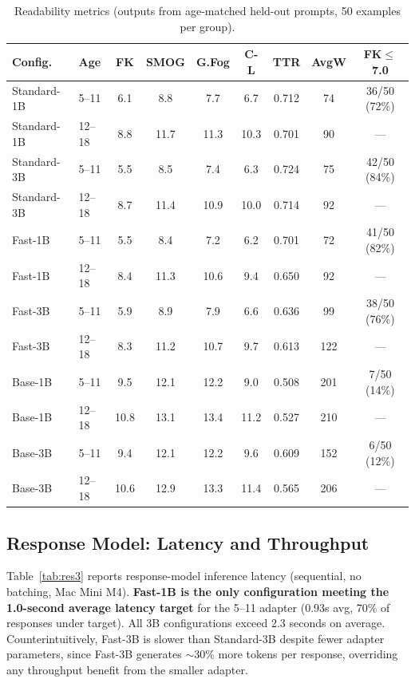 \documentclass[pdflatex,sn-mathphys-num]{sn-jnl}%
\begin{document}
\begin{table}[!h]
  \caption{Readability metrics (outputs from age-matched held-out prompts, 50 examples per group).}
  \label{tab:res2}
  \scriptsize
  \begin{tabular}{@{}llccccccc@{}}
    \toprule
    Config. & Age & FK & SMOG & G.Fog & C-L & TTR & AvgW & FK$\leq$7.0 \\
    \midrule
    Standard-1B & 5--11  & 6.1  & 8.8  & 7.7  & 6.7  & 0.712 & 74  & 36/50 (72\%) \\
    Standard-1B & 12--18 & 8.8  & 11.7 & 11.3 & 10.3 & 0.701 & 90  & ---          \\
    Standard-3B & 5--11  & 5.5  & 8.5  & 7.4  & 6.3  & 0.724 & 75  & 42/50 (84\%) \\
    Standard-3B & 12--18 & 8.7  & 11.4 & 10.9 & 10.0 & 0.714 & 92  & ---          \\
    Fast-1B     & 5--11  & 5.5  & 8.4  & 7.2  & 6.2  & 0.701 & 72  & 41/50 (82\%) \\
    Fast-1B     & 12--18 & 8.4  & 11.3 & 10.6 & 9.4  & 0.650 & 92  & ---          \\
    Fast-3B     & 5--11  & 5.9  & 8.9  & 7.9  & 6.6  & 0.636 & 99  & 38/50 (76\%) \\
    Fast-3B     & 12--18 & 8.3  & 11.2 & 10.7 & 9.7  & 0.613 & 122 & ---          \\
    Base-1B     & 5--11  & 9.5  & 12.1 & 12.2 & 9.0  & 0.508 & 201 & 7/50 (14\%)  \\
    Base-1B     & 12--18 & 10.8 & 13.1 & 13.4 & 11.2 & 0.527 & 210 & ---          \\
    Base-3B     & 5--11  & 9.4  & 12.1 & 12.2 & 9.6  & 0.609 & 152 & 6/50 (12\%)  \\
    Base-3B     & 12--18 & 10.6 & 12.9 & 13.3 & 11.4 & 0.565 & 206 & ---          \\
    \bottomrule
  \end{tabular}
\end{table}

\subsection{Response Model: Latency and Throughput}

Table~\ref{tab:res3} reports response-model inference latency (sequential, no batching, Mac Mini M4). \textbf{Fast-1B is the only configuration meeting the 1.0-second average latency target} for the 5--11 adapter (0.93s avg, 70\% of responses under target). All 3B configurations exceed 2.3 seconds on average. Counterintuitively, Fast-3B is slower than Standard-3B despite fewer adapter parameters, since Fast-3B generates $\sim$30\% more tokens per response, overriding any throughput benefit from the smaller adapter.
\end{document}
